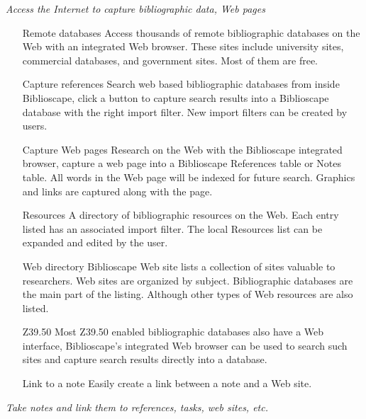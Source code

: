 \textit{Access the Internet to capture bibliographic data, Web pages}
\begin{itemize}

 \item[Remote databases] Access thousands of remote bibliographic
 databases on the Web with an integrated Web browser. These
 sites include university sites, commercial databases, and
 government sites. Most of them are free.

 \item[Capture references] Search web based bibliographic databases
 from inside Biblioscape, click a button to capture search results
 into a Biblioscape database with the right import filter. New import
 filters can be created by users.

 \item[Capture Web pages] Research on the Web with the Biblioscape
 integrated browser, capture a web page into a Biblioscape
 References table or Notes table. All words in the Web page will be
 indexed for future search. Graphics and links are captured along
 with the page.

 \item[Resources] A directory of bibliographic resources on the Web. Each
 entry listed has an associated import filter. The local Resources list
 can be expanded and edited by the user.

 \item[Web directory] Biblioscape Web site lists a collection of sites
 valuable to researchers. Web sites are organized by subject.
 Bibliographic databases are the main part of the listing. Although
 other types of Web resources are also listed.

 \item[Z39.50] Most Z39.50 enabled bibliographic databases also have a
 Web interface, Biblioscape's integrated Web browser can be used
 to search such sites and capture search results directly into a
 database. 

 \item[Link to a note] Easily create a link between a note and a Web site.

\end{itemize}


\textit{Take notes and link them to references, tasks, web sites, etc.}

